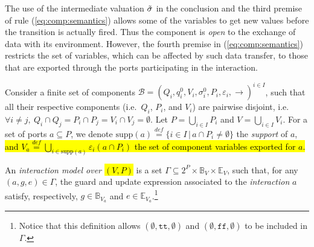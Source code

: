 \documentclass{llncs}
\newcommand{\Simon}{\\\hfill\mdash Simon}
\newcommand{\noteSB}[2][color=green!40, size=\tiny]{\todo[#1]{{#2}\Simon}}
\newcommand{\eq}[1]{(\ref{eq:#1})}
\newcommand{\cB}{\ensuremath{\mathcal{B}}}
\newcommand{\sB}{\ensuremath{\mathbb{B}}}
\newcommand{\sE}{\ensuremath{\mathbb{E}}}
\newcommand{\mdash}[1][]{---#1}
\newcommand{\ie}[1][\ ]{i.e.#1}
\newcommand{\bydef}[1]{\ensuremath{\stackrel{\mathit{\scriptscriptstyle def}}{#1}}}
\newcommand{\setdef}[2]{\ensuremath{\{{#1}\,|\,{#2}\}}}
\newcommand{\goesto}[2][]{\ensuremath{\xrightarrow[#1]{#2}}}
\newcommand{\true} {\ensuremath{\mathtt{t\!t}}}
\newcommand{\false}{\ensuremath{\mathtt{f\!f}}}
\newcommand{\noop} {\ensuremath{\emptyset}} %
\newcommand{\guards}[1]{\ensuremath{\sB_{#1}}}
\newcommand{\exprs}[1]{\ensuremath{\sE_{#1}}}
\newcommand{\val}[3][]{%
  \ensuremath{#1{\sigma}^{#2}_{#3}}%
}
\newcommand{\export}[1][]{\ensuremath{\varepsilon_{#1}}}
\newcommand{\supp}[1]{\ensuremath{\mathrm{supp}(#1)}}
\begin{document}
The use of the intermediate valuation $\tilde{\val{}{}}$ in the
conclusion and the third premise of rule \eq{comp:semantics}
allows some of the variables to get new values before the
transition is actually fired.  Thus the component is \emph{open}
to the exchange of data with its environment.  However, the
fourth premise in \eq{comp:semantics} restricts the set of
variables, which can be affected by such data transfer, to those
that are exported through the ports participating in the
interaction.

\begin{definition}
  \label{defn:im}
  Consider a finite set of components $\cB = (Q_i, q^0_i, V_i,
  \val{0}{i}, P_i, \export[i], \goesto{})^{i \in I}$, such that
  all their respective components (\ie $Q_i$, $P_i$, and $V_i$)
  are pairwise disjoint, \ie $\forall i \neq j,\ Q_i \cap Q_j =
  P_i \cap P_j = V_i \cap V_j = \emptyset$.  Let $P = \bigcup_{i
  \in I} P_i$ and $V = \bigcup_{i \in I} V_i$.
%
  For a set of ports $a \subseteq P$, we denote $\supp{a}
  \bydef{=} \setdef{i \in I}{a \cap P_i \neq \emptyset}$ the
  \emph{support} of $a$,
  \noteSB{Updated this}\hl{and $V_a \bydef{=} \bigcup_{i \in
    \supp{a}} \export[i](a \cap P_i)$ the set of component
  variables exported for $a$.}

  An \emph{interaction model over \hl{$(V,P)$}} is a set $\Gamma
  \subseteq 2^P \times \guards{V} \times \exprs{V}$, such that,
  for any $(a, g, e) \in \Gamma$, the guard and update expression
  associated to the \emph{interaction} $a$ satisfy, respectively,
  $g \in \guards{V_a}$ and $e \in \exprs{V_a}$.\footnote{%
%
    Notice that this definition allows $(\emptyset, \true,
    \noop)$ and $(\emptyset, \false, \noop)$ to be included in
    $\Gamma$.
%
  }


\end{definition}
\end{document}
